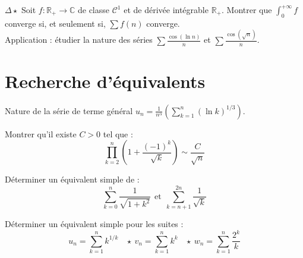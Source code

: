 \documentclass[french,a4paper]{article}
\newcommand{\R}{\mathbb{R}}
\newcommand{\C}{\mathbb{C}}
\theoremstyle{plain}
\theoremstyle{definition}
\theoremstyle{remark}
\begin{document}
\begin{ex}{$\Delta\star$}
	Soit $f:\R_+\to\C$ de classe $\mathcal{C}^1$ et de dérivée intégrable $\R_+$. Montrer que $\displaystyle\int_{0}^{+\infty}f$ converge si, et seulement si, $\displaystyle\sum f(n)$ converge. \\
	Application : étudier la nature des séries $\displaystyle\sum\frac{\cos(\ln n)}{n}$ et $\displaystyle\sum\frac{\cos(\sqrt{n})}{n}$.
\end{ex}

\section{Recherche d'équivalents}

\begin{ex}
	Nature de la série de terme général $u_n=\displaystyle\frac{1}{n^\alpha}\left(\sum_{k=1}^{n}(\ln k)^{1/3}\right)$.
\end{ex}

\begin{ex}{}
	Montrer qu'il existe $C>0$ tel que : $$\prod_{k=2}^{n}\left(1+\frac{(-1)^k}{\sqrt{k}}\right)\sim\frac{C}{\sqrt{n}}$$
\end{ex}

\begin{ex}{}
	Déterminer un équivalent simple de : $$\sum_{k=0}^{n}\frac{1}{\sqrt{1+k^2}}\ \ \text{et}\ \ \sum_{k=n+1}^{2n}\frac{1}{\sqrt{k}}$$
\end{ex}

\begin{ex}{}
	Déterminer un équivalent simple pour les suites : $$u_n=\sum_{k=1}^{n}k^{1/k}\ \ \ \ \star\ v_n=\sum_{k=1}^{n}k^k\ \ \ \ \star\ w_n=\sum_{k=1}^{n}\frac{2^k}{k}$$
\end{ex}
\end{document}
